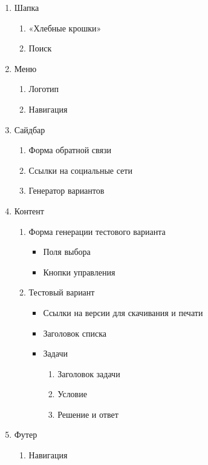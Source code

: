 \begin{enumerate}
	\item Шапка
	\begin{enumerate}
		\item «Хлебные крошки»
		\item Поиск
	\end{enumerate}

	\item Меню
	\begin{enumerate}
		\item Логотип
		\item Навигация
	\end{enumerate}

	\item Сайдбар
	\begin{enumerate}
		\item Форма обратной связи
		\item Ссылки на социальные сети
		\item Генератор вариантов
	\end{enumerate}

	\item Контент
	\begin{enumerate}
		\item Форма генерации тестового варианта
		\begin{itemize}
		\item Поля выбора
		\item Кнопки управления
		\end{itemize}

		\item Тестовый вариант
		\begin{itemize}
		\item Ссылки на версии для скачивания и печати
		\item Заголовок списка
		\item Задачи
		\begin{enumerate}
			\item Заголовок задачи
			\item Условие
			\item Решение и ответ
		\end{enumerate}
		\end{itemize}
	\end{enumerate}

	\item Футер
	\begin{enumerate}
		\item Навигация
	\end{enumerate}
\end{enumerate}

